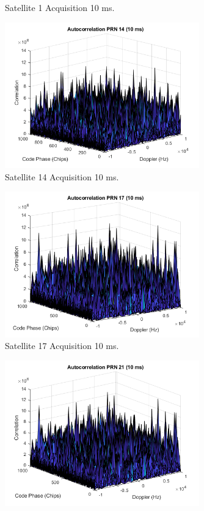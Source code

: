 \documentclass[11pt]{article}
\begin{document}
\begin{enumerate}[label=\textbf{\arabic*.}]
\begin{figure}[H]
        \caption{Satellite 1 Acquisition 10 ms.}
    \end{figure}
    \begin{figure}[H]
        \centering
        \includegraphics[width=0.75\textwidth]{Lab_4_PRN14_10ms.png}
        \caption{Satellite 14 Acquisition 10 ms.}
    \end{figure}
    \begin{figure}[H]
        \centering
        \includegraphics[width=0.75\textwidth]{Lab_4_PRN17_10ms.png}
        \caption{Satellite 17 Acquisition 10 ms.}
    \end{figure}
    \begin{figure}[H]
        \centering
        \includegraphics[width=0.75\textwidth]{Lab_4_PRN21_10ms.png}

\end{figure}
\end{enumerate}
\end{document}

